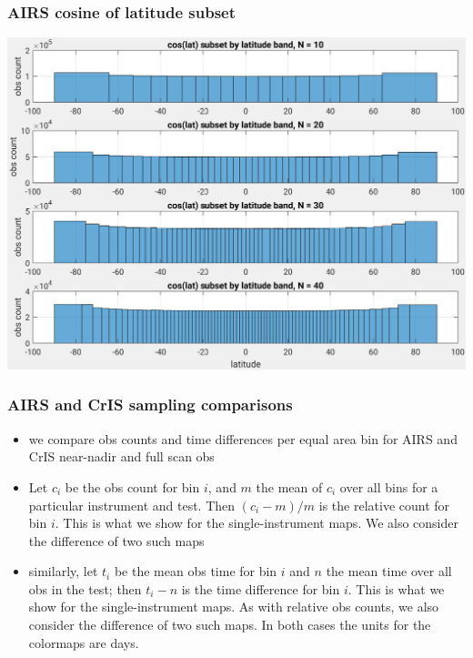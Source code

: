 \documentclass[11pt]{beamer}
\begin{document}
\begin{frame}
\frametitle{AIRS cosine of latitude subset}
\begin{center}
  \includegraphics[scale=0.5]{figures/airs_cos_lat_subset.pdf}
\end{center}
\end{frame} %
\begin{frame}
\frametitle{AIRS and CrIS sampling comparisons}

\begin{itemize}

  \item we compare obs counts and time differences per equal area
    bin for AIRS and CrIS near-nadir and full scan obs

  \item Let $c_i$ be the obs count for bin $i$, and $m$ the mean of
    $c_i$ over all bins for a particular instrument and test.  Then
    $(c_i - m) / m$ is the relative count for bin $i$.  This is what
    we show for the single-instrument maps.  We also consider the
    difference of two such maps

  \item similarly, let $t_i$ be the mean obs time for bin $i$ and
    $n$ the mean time over all obs in the test; then $t_i - n$ is
    the time difference for bin $i$.  This is what we show for the
    single-instrument maps.  As with relative obs counts, we also
    consider the difference of two such maps.   In both cases the
    units for the colormaps are days.

\end{itemize}
\end{frame}
\end{document}
